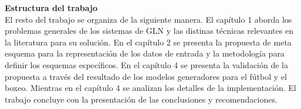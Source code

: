 
    \textbf{Estructura del trabajo}\\

    El resto del trabajo se organiza de la siguiente manera. El capítulo 1 aborda los problemas generales de los sistemas de GLN 
y las distinas técnicas relevantes en la literatura para su solución. En el capítulo 2 se presenta la propuesta de meta esquema para la 
representación de los datos de entrada y la metodología para definir los esquemas específicos. En el capítulo 4 se presenta la validación
de la propuesta a través del resultado de los modelos generadores para el fútbol y el boxeo. Mientras 
en el capítulo 4 se analizan los detalles de la implementación. El trabajo concluye con la presentación de las 
conclusiones y recomendaciones.